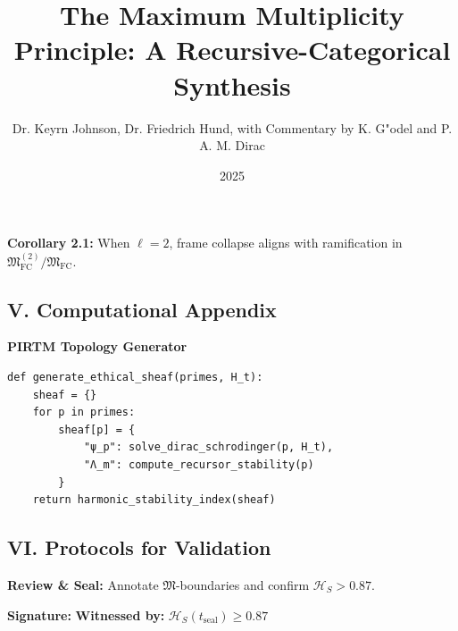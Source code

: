 \documentclass[12pt]{article}
\begin{document}
\textbf{Corollary 2.1:}
When $\ell = 2$, frame collapse aligns with ramification in $\mathfrak{M}_{\text{FC}}^{(2)}/\mathfrak{M}_{\text{FC}}$.

\begin{center}
\end{center}

\subsection*{V. Computational Appendix}

\textbf{PIRTM Topology Generator}
\begin{verbatim}
def generate_ethical_sheaf(primes, H_t):  
    sheaf = {}  
    for p in primes:  
        sheaf[p] = {  
            "ψ_p": solve_dirac_schrodinger(p, H_t),  
            "Λ_m": compute_recursor_stability(p)  
        }  
    return harmonic_stability_index(sheaf)
\end{verbatim}

\subsection*{VI. Protocols for Validation}

\textbf{Review \& Seal:}  
Annotate $\mathfrak{M}$-boundaries and confirm $\mathcal{H}_S > 0.87$.

\textbf{Signature:} \underline{\hspace{6cm}}  
\textbf{Witnessed by:} $\mathcal{H}_S(t_{\text{seal}}) \geq 0.87$

\title{The Maximum Multiplicity Principle: A Recursive-Categorical Synthesis}
\author{Dr. Keyrn Johnson, Dr. Friedrich Hund, with Commentary by K. G"odel and P. A. M. Dirac}
\date{2025}
\end{document}

